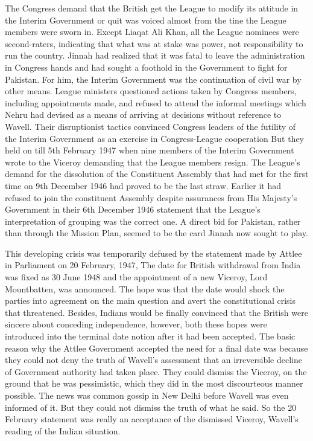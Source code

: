 The Congress demand that the British get the League to modify its attitude in the Interim Government or quit was voiced almost from the tine the League members were sworn in. Except Liaqat Ali Khan, all the League nominees were second-raters, indicating that what was at stake was power, not responsibility to run the country. Jinnah had realized that it was fatal to leave the administration in Congress hands and had sought a foothold in the Government to fight for Pakistan. For him, the Interim Government was the continuation of civil war by other means. League ministers questioned actions taken by Congress members, including appointments made, and refused to attend the informal meetings which Nehru had devised as a means of arriving at decisions without reference to Wavell. Their disruptionist tactics convinced Congress leaders of the futility of the Interim Government as an exercise in Congress-League cooperation But they held on till 5th February 1947 when nine members of the Interim Government wrote to the Viceroy demanding that the League members resign. The League's demand for the dissolution of the Constituent Assembly that had met for the first time on 9th December 1946 had proved to be the last straw. Earlier it had refused to join the constituent Assembly despite assurances from His Majesty's Government in their 6th December 1946 statement that the League's interpretation of grouping was the correct one. A direct bid for Pakistan, rather than through the Mission Plan, seemed to be the card Jinnah now sought to play. 

This developing crisis was temporarily defused by the statement made by Attlee in Parliament on 20 February, 1947, The date for British withdrawal from India was fixed as 30 June 1948 and the appointment of a new Viceroy, Lord Mountbatten, was announced. The hope was that the date would shock the parties into agreement on the main question and avert the constitutional crisis that threatened. Besides, Indians would be finally convinced that the British were sincere about conceding independence, however, both these hopes were introduced into the terminal date notion after it had been accepted. The basic reason why the Attlee Government accepted the need for a final date was because they could not deny the truth of Wavell's assessment that an irreversible decline of Government authority had taken place. They could dismiss the Viceroy, on the ground that he was pessimistic, which they did in the most discourteous manner possible. The news was common gossip in New Delhi before Wavell was even informed of it. But they could not dismiss the truth of what he said. So the 20 February statement was really an acceptance of the dismissed Viceroy, Wavell's reading of the Indian situation. 

